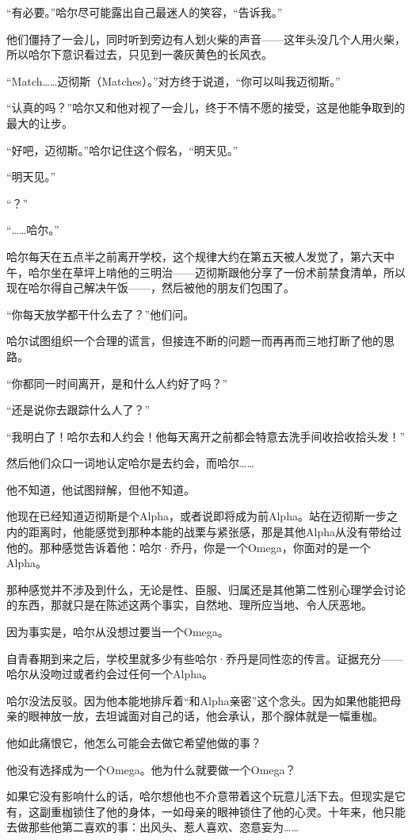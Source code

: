 \documentclass[../main]{subfiles}
\begin{document}
“有必要。”哈尔尽可能露出自己最迷人的笑容，“告诉我。”

他们僵持了一会儿，同时听到旁边有人划火柴的声音——这年头没几个人用火柴，所以哈尔下意识看过去，只见到一袭灰黄色的长风衣。

“Match……迈彻斯（Matches）。”对方终于说道，“你可以叫我迈彻斯。”

“认真的吗？”哈尔又和他对视了一会儿，终于不情不愿的接受，这是他能争取到的最大的让步。

“好吧，迈彻斯。”哈尔记住这个假名，“明天见。”

“明天见。”

“？”

“……哈尔。”

哈尔每天在五点半之前离开学校，这个规律大约在第五天被人发觉了，第六天中午，哈尔坐在草坪上啃他的三明治——迈彻斯跟他分享了一份术前禁食清单，所以现在哈尔得自己解决午饭——，然后被他的朋友们包围了。

“你每天放学都干什么去了？”他们问。

哈尔试图组织一个合理的谎言，但接连不断的问题一而再再而三地打断了他的思路。

“你都同一时间离开，是和什么人约好了吗？”

“还是说你去跟踪什么人了？”

“我明白了！哈尔去和人约会！他每天离开之前都会特意去洗手间收拾收拾头发！”

然后他们众口一词地认定哈尔是去约会，而哈尔……

他不知道，他试图辩解，但他不知道。

他现在已经知道迈彻斯是个Alpha，或者说即将成为前Alpha。站在迈彻斯一步之内的距离时，他能感觉到那种本能的战栗与紧张感，那是其他Alpha从没有带给过他的。那种感觉告诉着他：哈尔·乔丹，你是一个Omega，你面对的是一个Alpha。

那种感觉并不涉及到什么，无论是性、臣服、归属还是其他第二性别心理学会讨论的东西，那就只是在陈述这两个事实，自然地、理所应当地、令人厌恶地。

因为事实是，哈尔从没想过要当一个Omega。

自青春期到来之后，学校里就多少有些哈尔·乔丹是同性恋的传言。证据充分——哈尔从没吻过或者约会过任何一个Alpha。

哈尔没法反驳。因为他本能地排斥着“和Alpha亲密”这个念头。因为如果他能把母亲的眼神放一放，去坦诚面对自己的话，他会承认，那个腺体就是一幅重枷。

他如此痛恨它，他怎么可能会去做它希望他做的事？

他没有选择成为一个Omega。他为什么就要做一个Omega？

如果它没有影响什么的话，哈尔想他也不介意带着这个玩意儿活下去。但现实是它有，这副重枷锁住了他的身体，一如母亲的眼神锁住了他的心灵。十年来，他只能去做那些他第二喜欢的事：出风头、惹人喜欢、恣意妄为……
\end{document}
